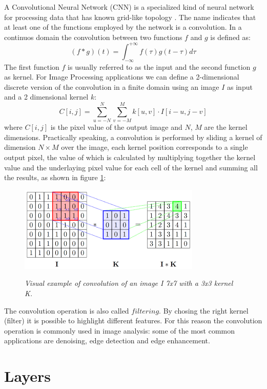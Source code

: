 \documentclass[12pt,a4paper]{report}
\begin{document}
A Convolutional Neural Network (CNN) is a specialized kind of neural network for processing data that has known grid-like topology \cite{Goodfellow-et-al-2016}. 
The name indicates that at least one of the functions employed by the network is a convolution. In a continuos domain the convolution between two functions $f$ and $g$ is defined as: 
\begin{equation}
 (f * g)(t) = \int_{-\infty}^{+\infty} f(\tau)g(t-\tau)d\tau
\end{equation}
The first function $f$ is usually referred to as the input and the second function $g$ as kernel. 
For Image Processing applications we can define a 2-dimensional discrete version of the convolution in a finite domain using an image $I$ as input and a 2 dimensional kernel $k$:
\begin{equation}
 C[i, j] = \sum_{u=-N}^N \sum_{v=-M}^M k[u, v] \cdot I[i-u, j-v]
\end{equation}
where $C[i, j]$ is the pixel value of the output image and $N$, $M$ are the kernel dimensions.
Practically speaking, a convolution is performed by sliding a kernel of dimension $N \times M$ over the image, each kernel position corresponds to a single output pixel, the value of which is calculated by multiplying together the kernel value and the underlaying pixel value for each cell of the kernel and summing all the results, as shown in figure \ref{fig:convolution}:

\begin{figure}[h]
 \centering
 \includegraphics[scale=1.]{./images/conv.png}
 \label{fig:convolution}
 \caption{\it Visual example of convolution of an image I 7x7 with a 3x3 kernel K.}
\end{figure}

The convolution operation is also called $filtering$. By chosing the right kernel (filter) it is possible to highlight different features. For this reason the convolution operation is commonly used in image analysis: some of the most common applications are denoising, edge detection and edge enhancement. 

\section{Layers}
\end{document}
